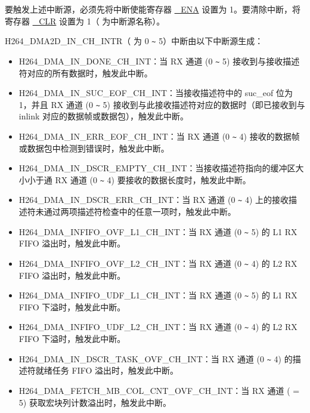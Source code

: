 \documentclass[main\_\_CN.tex]{subfiles}
\begin{document}
要触发上述中断源，必须先将中断使能寄存器 \hyperref[fielddesc:H264DMAMOVE2MBLINEDONEINTENA]{\_ENA} 设置为 1。要清除中断，将寄存器 \hyperref[fielddesc:H264DMAMOVE2MBLINEDONEINTCLR]{\_CLR} 设置为 1（ 为中断源名称）。

H264\_DMA2D\_IN\_CH\_INTR（ 为 0 \verb+~+ 5）中断由以下中断源生成：

\begin{itemize}
\item H264\_DMA\_IN\_DONE\_CH\_INT：当 RX 通道  (0 \verb+~+ 5) 接收到与接收描述符对应的所有数据时，触发此中断。
\item H264\_DMA\_IN\_SUC\_EOF\_CH\_INT：当接收描述符中的 suc\_eof 位为 1，并且 RX 通道  (0 \verb+~+ 5) 接收到与此接收描述符对应的数据时（即已接收到与 inlink 对应的数据帧或数据包），触发此中断。
\item H264\_DMA\_IN\_ERR\_EOF\_CH\_INT：当 RX 通道  (0 \verb+~+ 4) 接收的数据帧或数据包中检测到错误时，触发此中断。
\item H264\_DMA\_IN\_DSCR\_EMPTY\_CH\_INT：当接收描述符指向的缓冲区大小小于通 RX 通道  (0 \verb+~+ 4) 要接收的数据长度时，触发此中断。
\item H264\_DMA\_IN\_DSCR\_ERR\_CH\_INT：当 RX 通道  (0 \verb+~+ 4) 上的接收描述符未通过两项描述符检查中的任意一项时，触发此中断。
\item H264\_DMA\_INFIFO\_OVF\_L1\_CH\_INT：当 RX 通道  (0 \verb+~+ 5) 的 L1 RX FIFO 溢出时，触发此中断。
\item H264\_DMA\_INFIFO\_OVF\_L2\_CH\_INT：当 RX 通道  (0 \verb+~+ 4) 的 L2 RX FIFO 溢出时，触发此中断。
\item H264\_DMA\_INFIFO\_UDF\_L1\_CH\_INT：当 RX 通道  (0 \verb+~+ 5) 的 L1 RX FIFO 下溢时，触发此中断。
\item H264\_DMA\_INFIFO\_UDF\_L2\_CH\_INT：当 RX 通道  (0 \verb+~+ 4) 的 L2 RX FIFO 下溢时，触发此中断。
\item H264\_DMA\_IN\_DSCR\_TASK\_OVF\_CH\_INT：当 RX 通道  (0 \verb+~+ 4) 的描述符就绪任务 FIFO 溢出时，触发此中断。
\item H264\_DMA\_FETCH\_MB\_COL\_CNT\_OVF\_CH\_INT：当 RX 通道  ( = 5) 获取宏块列计数溢出时，触发此中断。
\end{itemize}
\end{document}
